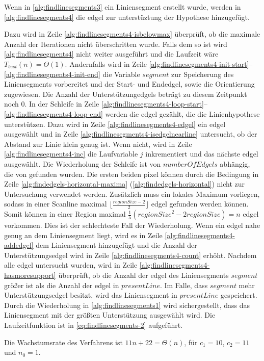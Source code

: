 Wenn in \autoref{alg:findlinesegments3} ein Liniensegment erstellt wurde, werden in \autoref{alg:findlinesegments4} die
 \gls{edgel} zur unterstüztung der Hypothese hinzugefügt.

Dazu wird in Zeile \ref{alg:findlinesegments4-isbelowmax} überprüft, ob die maximale Anzahl der Iterationen nicht
 überschritten wurde. Falls dem so ist wird \autoref{alg:findlinesegments4} nicht weiter ausgeführt und die Laufzeit
 wäre $T_{best}(n) = \Theta(1)$. Andernfalls wird in Zeile
 \ref{alg:findlinesegments4-init-start}--\ref{alg:findlinesegments4-init-end} die Variable $\mathit{segment}$ zur
 Speicherung des Liniensegments vorbereitet und der Start- und Endedgel, sowie die Orientierung zugewiesen. Die Anzahl
 der Unterstützungedgels beträgt zu diesem Zeitpunkt noch $0$. In der Schleife in Zeile
 \ref{alg:findlinesegments4-loop-start}--\ref{alg:findlinesegments4-loop-end} werden die \gls{edgel} gezählt, die die
 Linienhypothese unterstützen. Dazu wird in Zeile \ref{alg:findlinesegments4-edgel} ein \gls{edgel} ausgewählt und in
 Zeile \ref{alg:findlinesegments4-isedgelnearline} untersucht, ob der Abstand zur Linie klein genug ist. Wenn nicht,
 wird in Zeile \ref{alg:findlinesegments4-inc} die Laufvariable $j$ inkrementiert und das nächste \gls{edgel}
 ausgewählt. Die Wiederholung der Schleife ist von $\mathit{numberOfEdgels}$ abhängig, die von 
 gefunden wurden. Die ersten beiden \gls{pixel} können durch die Bedingung in Zeile
 \ref{alg:findedgels-horizontal-maxima} (\autoref{alg:findedgels-horizontal}) nicht zur Untersuchung verwendet werden.
 Zusätzlich muss ein lokales Maximum vorliegen, sodass in einer Scanline maximal
 $\bigl\lfloor\tfrac{\mathit{regionSize}-2}{2}\bigr\rfloor$ \gls{edgel} gefunden werden können. Somit können in einer
 Region maximal $\tfrac{1}{5}(\mathit{regionSize}^2 -2\mathit{regionSize}) = n$ \gls{edgel} vorkommen. Dies ist der
 schlechteste Fall der Wiederholung. Wenn ein \gls{edgel} nahe genug an dem Liniensegment liegt, wird es in Zeile
 \ref{alg:findlinesegments4-addedgel} dem Liniensegment hinzugefügt und die Anzahl der Unterstützungsedgel wird in
 Zeile \ref{alg:findlinesegments4-count} erhöht. Nachdem alle \gls{edgel} untersucht wurden, wird in Zeile
 \ref{alg:findlinesegments4-hasmoresupport} überprüft, ob die Anzahl der \gls{edgel} des Liniensegments
 $\mathit{segment}$ größer ist als die Anzahl der \gls{edgel} in $\mathit{presentLine}$. Im Falle, dass
 $\mathit{segment}$ mehr Unterstützungsedgel besitzt, wird das Liniensegment in $\mathit{presentLine}$ gespeichert.
 Durch die Wiederholung in \autoref{alg:findlinesegments1} wird sichergestellt, dass das Liniensegment mit der größten
 Unterstützung ausgewählt wird. Die Laufzeitfunktion ist in \autoref{eq:findlinesegments-2} aufgeführt.

Die Wachstumsrate des Verfahrens ist $11n + 22 = \Theta(n)$, für $c_{1} = 10$, $c_{2} = 11$ und $n_{0} = 1$.

